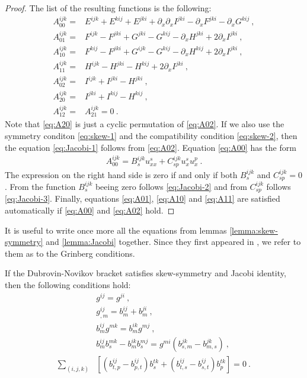 \begin{proof}
    The list of the resulting functions is the following:
    \begin{align}
        A_{00}^{ijk} =& E^{ijk} + E^{kij} + E^{jki} + \partial_x \partial_x I^{jki} - \partial_x F^{jki} - \partial_x G^{kij} \:, \label{eq:A00}\\
        A_{01}^{ijk} =& F^{ijk} - F^{jki} + G^{jki} - G^{kij} - \partial_x H^{jki} + 2 \partial_x I^{jki} \:, \label{eq:A01}\\
        A_{10}^{ijk} =& F^{kij} - F^{jki} + G^{ijk} - G^{kij} - \partial_x H^{kij} + 2 \partial_x I^{jki} \:, \label{eq:A10}\\
        A_{11}^{ijk} =& H^{ijk} - H^{jki} - H^{kij} + 2 \partial_x I^{jki} \:, \label{eq:A11} \\
        A_{02}^{ijk} =& I^{ijk} + I^{jki} - H^{jki}\:, \label{eq:A02}\\
        A_{20}^{ijk} =& I^{jki} + I^{kij} - H^{kij}\:, \label{eq:A20} \\
        A^{ijk}_{12} =& A^{ijk}_{21} = 0 \:.
    \end{align}
    Note that \eqref{eq:A20} is just a cyclic permutation of \eqref{eq:A02}. If we also use the symmetry conditon \eqref{eq:skew-1} and the compatibility condition \eqref{eq:skew-2}, then the equation \eqref{eq:Jacobi-1} follows from \eqref{eq:A02}. Equation \eqref{eq:A00} has the form
    \begin{align}
        A_{00}^{ijk} = B^{ijk}_s u^s_{xx} + C^{ijk}_{sp} u^s_x u^p_x \:.
    \end{align}
    The expression on the right hand side is zero if and only if both $B^{ijk}_s$ and $C^{ijk}_{sp} = 0$. From the function $B^{ijk}_s$ beeing zero follows \eqref{eq:Jacobi-2} and from $C^{ijk}_{sp}$ follows \eqref{eq:Jacobi-3}. Finally, equations \eqref{eq:A01}, \eqref{eq:A10} and \eqref{eq:A11} are satisfied automatically if \eqref{eq:A00} and \eqref{eq:A02} hold.
\end{proof}

It is useful to write once more all the equations from lemmas \vref{lemma:skew-symmetry} and \vref{lemma:Jacobi} together. Since they first appeared in \cite{Grinberg}, we refer to them as to the Grinberg conditions.
\begin{lemma} \label{Grinberg conditions}
    If the Dubrovin-Novikov bracket satisfies skew-symmetry and Jacobi identity, then the following conditions hold:
    \begin{align}
        &g^{ij} = g^{ji} \:, \label{eq:Grinberg-1}\\
        &g^{ij}_{,m} = b^{ij}_m + b^{ji}_m \:, \label{eq:Grinberg-2}\\
        &b^{ij}_m g^{mk} = b^{ik}_m g^{mj} \:, \label{eq:Grinberg-3}\\
        &b^{ij}_{m} b^{mk}_s - b^{ik}_m b^{mj}_s = g^{mi} \left( b^{jk}_{s,m} - b^{jk}_{m,s} \right) \:, \label{eq:Grinberg-4}\\
        \sum_{(i,j,k)}& \left[ (b^{ij}_{t,p} - b^{ij}_{p,t}) b^{tk}_s + (b^{ij}_{t,s} - b^{ij}_{s,t}) b^{tk}_p \right] = 0 \:. \label{eq:Grinberg-5}
    \end{align}
\end{lemma}

